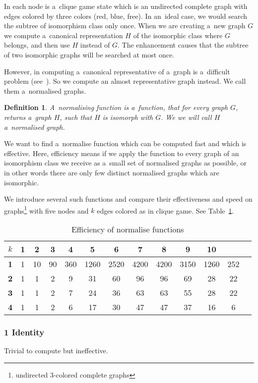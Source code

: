 In each node is a~clique game state which is an undirected complete graph with
edges colored by three colors (red, blue, free).
In an~ideal case, we would search the subtree of isomorphism class
only once. When we are creating a~new graph $G$ we compute a~canonical
representation $H$ of the isomorphic class where $G$ belongs, and then use $H$ instead
of $G$. The enhancement  causes that the
subtree of two isomorphic graphs will be searched at most once.

However, in computing a~canonical representative of a~graph is a~difficult
problem (see~\cite{canonical}). So we compute an almost representative graph
instead. We call them a~normalised graphs.

\newtheorem*{norm}{Definition}	
\begin{norm}
{\sl A~normalising function} is a~function, that for
every graph $G$, returns a~graph $H$, such that $H$ is isomorph with $G$. We we will call
$H$ a~{\sl normalised graph}.
\end{norm}

We want to find a~normalise function which can be computed fast and which is
effective. Here, efficiency means if we apply the function to every graph of an
isomorphism class we receive as a~small set of normalised graphs as possible, or
in other words there are only few distinct normalised graphs which are
isomorphic.

We introduce several such functions and compare their effectiveness and speed
on graphs\footnote{undirected 3-colored complete graphs} with five nodes and
$k$ edges colored as in clique game. See Table~\ref{statsNorm}. 

\begin{table}
\centering
\begin{tabular}{c|c|c|c|c|c|c|c|c|c|c|c|c}
$k$&1&2&3&4&5&6&7&8&9&10\\
\hline
\textbf{1}&1&10&90&360&1260&2520&4200&4200&3150&1260&252\\
\textbf{2}&1&1&2&9&31&60&96&96&69&28&22\\
\textbf{3}&1&1&2&7&24&36&63&63&55&28&22\\
\textbf{4}&1&1&2&6&17&30&47&47&37&16&6\\
\end{tabular}
\caption{Efficiency of normalise functions}
\label{statsNorm}
\end{table}

\subsubsection{1 Identity}
Trivial to compute but ineffective.

